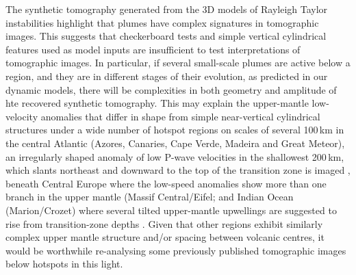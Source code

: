\documentclass[a4paper,10pt,twocolumn]{paper}
\begin{document}
The synthetic tomography generated from the 3D models of Rayleigh Taylor instabilities highlight that plumes have complex signatures in tomographic images. This suggests that checkerboard tests and simple vertical cylindrical features used as model inputs are insufficient to test interpretations of tomographic images. In particular, if several small-scale plumes are active below a region, and they are in different stages of their evolution, as predicted in our dynamic models, there will be complexities in both geometry and amplitude of hte recovered synthetic tomography. This may explain the upper-mantle low-velocity anomalies that differ in shape from simple near-vertical cylindrical structures under a wide number of hotspot regions on scales of several 100\,km in the central Atlantic (Azores, Canaries, Cape Verde, Madeira and Great Meteor), an irregularly shaped anomaly of low P-wave velocities in the shallowest 200\,km, which slants northeast and downward to the top of the transition zone is imaged \citep{vinnik-etal-2012,yang-etal-2006}, beneath Central Europe where the low-speed anomalies show more than one branch in the upper mantle (Massif Central/Eifel; \citealp{granet-etal-1995,ritter-etal-2001} and Indian Ocean (Marion/Crozet) where several tilted upper-mantle upwellings are suggested to rise from transition-zone depths \citep{davaille-etal-2005,montelli-etal-2004a}. Given that other regions exhibit similarly complex upper mantle structure and/or spacing between volcanic centres, it would be worthwhile re-analysing some previously published tomographic images below hotspots in this light.
\end{document}
